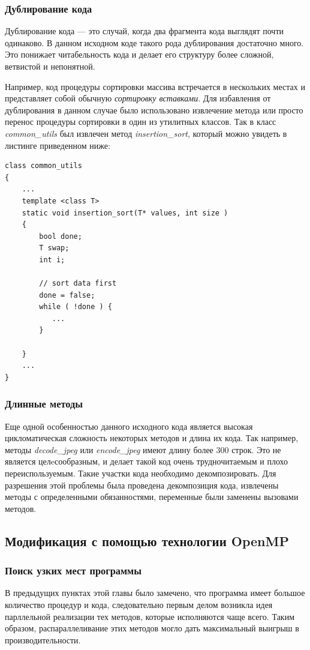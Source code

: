 \documentclass{matmex-diploma-custom}
\begin{document}
\subsubsection{Дублирование кода}
Дублирование кода --- это случай, когда два фрагмента кода выглядят почти одинаково. В данном исходном коде такого рода дублирования достаточно много. Это понижает читабельность кода и делает его структуру более сложной, ветвистой и непонятной.

Например, код процедуры сортировки массива встречается в нескольких  местах и представляет собой обычную \emph{сортировку вставками}. Для избавления от дублирования в данном случае было использовано извлечение метода или  просто перенос процедуры сортировки в один из утилитных  классов. Так в класс \emph{common\_utils} был извлечен метод \emph{insertion\_sort}, который можно увидеть в листинге приведенном ниже:

\begin{lstlisting}
class common_utils
{
    ...
    template <class T>
    static void insertion_sort(T* values, int size )
    {
        bool done;
        T swap;
        int i;

        // sort data first
        done = false;
        while ( !done ) {
           ...
        }

    }
    ...
}
\end{lstlisting}

\subsubsection{Длинные методы}
Еще одной особенностью данного исходного кода является высокая цикломатическая сложность некоторых методов и длина их кода. Так например, методы \emph{decode\_jpeg} или \emph{encode\_jpeg} имеют длину более 300 строк. Это не является целeсообразным, и делает такой код очень трудночитаемым и плохо переиспользуемым. Такие участки кода необходимо декомпозировать. Для разрешения этой проблемы была проведена декомпозиция кода, извлечены методы с определенными обязанностями, переменные были  заменены вызовами методов.

\subsection{Модификация с помощью технологии OpenMP}

\subsubsection{Поиск узких мест программы}
В предыдущих пунктах этой главы было замечено, что программа имеет большое количество процедур и кода, следовательно первым делом возникла идея парллельной реализации тех методов, которые исполняются чаще всего. Таким образом, распараллеливание этих методов могло дать максимальный выигрыш в производительности.
\end{document}
